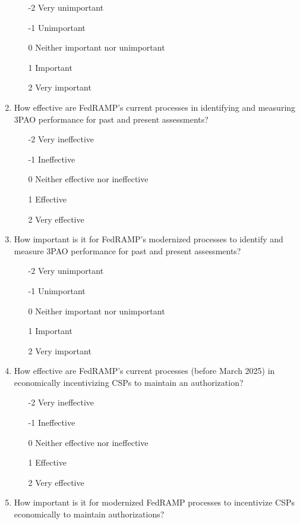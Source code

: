 \documentclass{jdf}
\begin{document}
\begin{enumerate}
    \begin{enumerate}
        \item [-2] Very unimportant
        \item [-1] Unimportant
        \item  [0] Neither important nor unimportant
        \item  [1] Important
        \item  [2] Very important
    \end{enumerate}
    \item How effective are FedRAMP's current processes in identifying and measuring 3PAO performance for past and present assessments?
    \begin{enumerate}
        \item [-2] Very ineffective
        \item [-1] Ineffective
        \item  [0] Neither effective nor ineffective
        \item  [1] Effective 
        \item  [2] Very effective
    \end{enumerate}
    \item How important is it for FedRAMP's modernized processes to identify and measure 3PAO performance for past and present assessments?
    \begin{enumerate}
        \item [-2] Very unimportant
        \item [-1] Unimportant
        \item  [0] Neither important nor unimportant
        \item  [1] Important
        \item  [2] Very important
    \end{enumerate}
    \item How effective are FedRAMP's current processes (before March 2025) in economically incentivizing CSPs to maintain an authorization?
    \begin{enumerate}
        \item [-2] Very ineffective
        \item [-1] Ineffective
        \item  [0] Neither effective nor ineffective
        \item  [1] Effective 
        \item  [2] Very effective
    \end{enumerate}
    \item How important is it for modernized FedRAMP processes to incentivize CSPs economically to maintain authorizations?

\end{enumerate}
\end{document}
